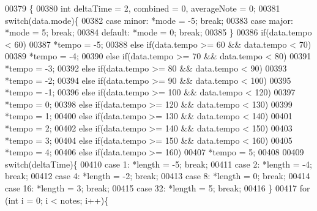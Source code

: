 \begin{DoxyCode}
00379                                                                                                            
              \{
00380   \textcolor{keywordtype}{int} deltaTime = 2, combined = 0, averageNote = 0;
00381   \textcolor{keywordflow}{switch}(data.mode)\{
00382     \textcolor{keywordflow}{case} minor: *mode = -5; \textcolor{keywordflow}{break};
00383     \textcolor{keywordflow}{case} major: *mode = 5; \textcolor{keywordflow}{break};
00384     \textcolor{keywordflow}{default}: *mode = 0; \textcolor{keywordflow}{break};
00385   \}
00386   \textcolor{keywordflow}{if}(data.tempo < 60)
00387     *tempo = -5;
00388   \textcolor{keywordflow}{else} \textcolor{keywordflow}{if}(data.tempo >= 60 && data.tempo < 70)
00389     *tempo = -4;
00390   \textcolor{keywordflow}{else} \textcolor{keywordflow}{if}(data.tempo >= 70 && data.tempo < 80)
00391     *tempo = -3;  
00392   \textcolor{keywordflow}{else} \textcolor{keywordflow}{if}(data.tempo >= 80 && data.tempo < 90)
00393     *tempo = -2;
00394   \textcolor{keywordflow}{else} \textcolor{keywordflow}{if}(data.tempo >= 90 && data.tempo < 100)
00395     *tempo = -1;
00396   \textcolor{keywordflow}{else} \textcolor{keywordflow}{if}(data.tempo >= 100 && data.tempo < 120)
00397     *tempo =  0;  
00398   \textcolor{keywordflow}{else} \textcolor{keywordflow}{if}(data.tempo >= 120 && data.tempo < 130)
00399     *tempo =  1;
00400   \textcolor{keywordflow}{else} \textcolor{keywordflow}{if}(data.tempo >= 130 && data.tempo < 140)
00401     *tempo =  2;
00402   \textcolor{keywordflow}{else} \textcolor{keywordflow}{if}(data.tempo >= 140 && data.tempo < 150)
00403     *tempo =  3;
00404   \textcolor{keywordflow}{else} \textcolor{keywordflow}{if}(data.tempo >= 150 && data.tempo < 160)
00405     *tempo =  4;
00406   \textcolor{keywordflow}{else} \textcolor{keywordflow}{if}(data.tempo >=  160)
00407     *tempo =  5;
00408 
00409   \textcolor{keywordflow}{switch}(deltaTime)\{
00410     \textcolor{keywordflow}{case} 1: *length = -5; \textcolor{keywordflow}{break};
00411     \textcolor{keywordflow}{case} 2: *length = -4; \textcolor{keywordflow}{break};
00412     \textcolor{keywordflow}{case} 4: *length = -2; \textcolor{keywordflow}{break};
00413     \textcolor{keywordflow}{case} 8: *length =  0; \textcolor{keywordflow}{break};
00414     \textcolor{keywordflow}{case} 16: *length = 3; \textcolor{keywordflow}{break};
00415     \textcolor{keywordflow}{case} 32: *length = 5; \textcolor{keywordflow}{break};
00416   \}
00417   \textcolor{keywordflow}{for} (\textcolor{keywordtype}{int} i = 0; i < notes; i++)\{

\end{DoxyCode}
